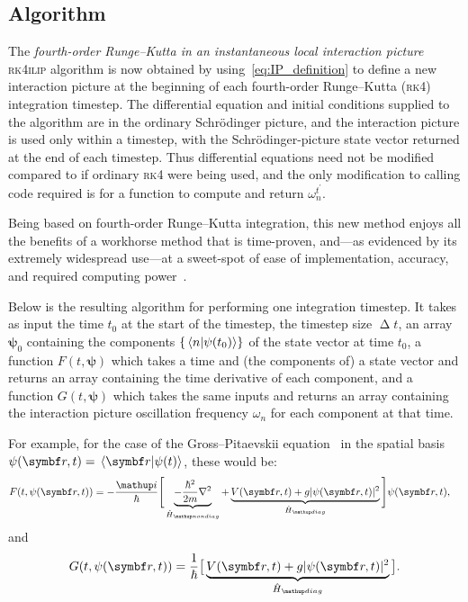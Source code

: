 \subsection{Algorithm}
The \emph{fourth-order Runge--Kutta in an instantaneous local interaction picture} \textsc{rk4ilip} algorithm is now obtained by using~\eqref{eq:IP_definition} to define a new interaction picture at the beginning of each fourth-order Runge–Kutta (\textsc{rk4}) integration timestep. The differential equation and initial conditions supplied to the algorithm are in the ordinary Schr\"odinger picture, and the interaction picture is used only within a timestep, with the Schr\"odinger-picture state vector returned at the end of each timestep. Thus differential equations need not be modified compared to if ordinary \textsc{rk4} were being used, and the only modification to calling code required is for a function to compute and return $\omega_n^{t^\prime}$.

Being based on fourth-order Runge--Kutta integration, this new method enjoys all the benefits of a workhorse method that is time-proven, and---as evidenced by its extremely widespread use---at a sweet-spot of ease of implementation, accuracy, and required computing power~\cite{artofscientificcomputing1992}.

Below is the resulting algorithm for performing one integration timestep. It takes as input the time $t_0$ at the start of the timestep, the timestep size $\upDelta t$, an array $\mathbf{\psi}_0$ containing the components $\{\braket{n}{\psi(t_0)}\}$ of the state vector at time $t_0$, a function $F(t, \mathbf{\psi})$ which takes a time and (the components of) a state vector and returns an array containing the time derivative of each component, and a function $G(t, \mathbf{\psi})$ which takes the same inputs and returns an array containing the interaction picture oscillation frequency $\omega_n$ for each component at that time.

For example, for the case of the Gross--Pitaevskii equation~\cite{pethick2002bose} in the spatial basis $\psi(\vec r, t) = \braket{\vec r}{\psi(t)}$, these would be:
\begin{align}\label{eq:RK4_ILIP_GPE}
F(t, \psi(\vec r, t)) &= -\frac \ii \hbar\Bigg[\underbrace{-\frac{\hbar^2}{2m}\nabla^2}_{\hat H_\up{nondiag}} + \underbrace{V(\vec r, t) + g|\psi(\vec r, t)|^2}_{\hat H_\up{diag}}\Bigg]\psi(\vec r, t),
\end{align}
and
\begin{align}
G(t, \psi(\vec r, t)) = \frac1\hbar\big[\underbrace{V(\vec r, t) + g|\psi(\vec r, t)|^2}_{\hat H_\up{diag}}\big].
\end{align}


